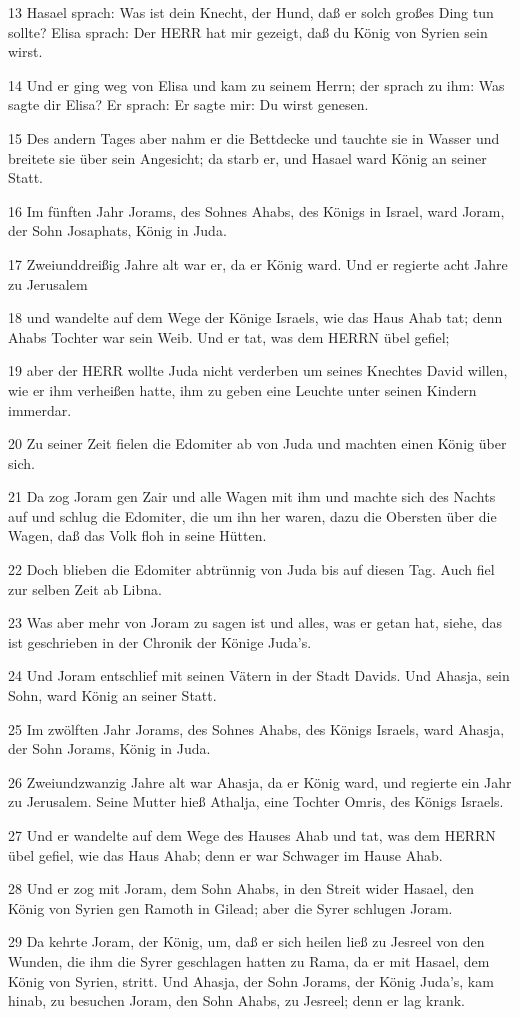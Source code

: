 \par 13 Hasael sprach: Was ist dein Knecht, der Hund, daß er solch großes Ding tun sollte? Elisa sprach: Der HERR hat mir gezeigt, daß du König von Syrien sein wirst.
\par 14 Und er ging weg von Elisa und kam zu seinem Herrn; der sprach zu ihm: Was sagte dir Elisa? Er sprach: Er sagte mir: Du wirst genesen.
\par 15 Des andern Tages aber nahm er die Bettdecke und tauchte sie in Wasser und breitete sie über sein Angesicht; da starb er, und Hasael ward König an seiner Statt.
\par 16 Im fünften Jahr Jorams, des Sohnes Ahabs, des Königs in Israel, ward Joram, der Sohn Josaphats, König in Juda.
\par 17 Zweiunddreißig Jahre alt war er, da er König ward. Und er regierte acht Jahre zu Jerusalem
\par 18 und wandelte auf dem Wege der Könige Israels, wie das Haus Ahab tat; denn Ahabs Tochter war sein Weib. Und er tat, was dem HERRN übel gefiel;
\par 19 aber der HERR wollte Juda nicht verderben um seines Knechtes David willen, wie er ihm verheißen hatte, ihm zu geben eine Leuchte unter seinen Kindern immerdar.
\par 20 Zu seiner Zeit fielen die Edomiter ab von Juda und machten einen König über sich.
\par 21 Da zog Joram gen Zair und alle Wagen mit ihm und machte sich des Nachts auf und schlug die Edomiter, die um ihn her waren, dazu die Obersten über die Wagen, daß das Volk floh in seine Hütten.
\par 22 Doch blieben die Edomiter abtrünnig von Juda bis auf diesen Tag. Auch fiel zur selben Zeit ab Libna.
\par 23 Was aber mehr von Joram zu sagen ist und alles, was er getan hat, siehe, das ist geschrieben in der Chronik der Könige Juda's.
\par 24 Und Joram entschlief mit seinen Vätern in der Stadt Davids. Und Ahasja, sein Sohn, ward König an seiner Statt.
\par 25 Im zwölften Jahr Jorams, des Sohnes Ahabs, des Königs Israels, ward Ahasja, der Sohn Jorams, König in Juda.
\par 26 Zweiundzwanzig Jahre alt war Ahasja, da er König ward, und regierte ein Jahr zu Jerusalem. Seine Mutter hieß Athalja, eine Tochter Omris, des Königs Israels.
\par 27 Und er wandelte auf dem Wege des Hauses Ahab und tat, was dem HERRN übel gefiel, wie das Haus Ahab; denn er war Schwager im Hause Ahab.
\par 28 Und er zog mit Joram, dem Sohn Ahabs, in den Streit wider Hasael, den König von Syrien gen Ramoth in Gilead; aber die Syrer schlugen Joram.
\par 29 Da kehrte Joram, der König, um, daß er sich heilen ließ zu Jesreel von den Wunden, die ihm die Syrer geschlagen hatten zu Rama, da er mit Hasael, dem König von Syrien, stritt. Und Ahasja, der Sohn Jorams, der König Juda's, kam hinab, zu besuchen Joram, den Sohn Ahabs, zu Jesreel; denn er lag krank.

